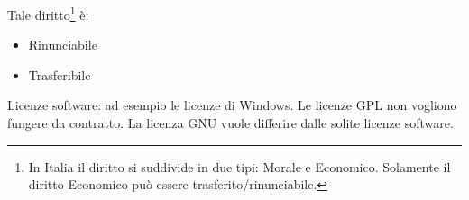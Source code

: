 Tale diritto\footnote{In Italia il diritto si suddivide in due tipi: Morale e Economico. Solamente il diritto Economico pu\`o essere trasferito/rinunciabile.} \`e:
\begin{itemize}

\item Rinunciabile
\item Trasferibile

\end{itemize}

Licenze software: ad esempio le licenze di Windows. Le licenze GPL non vogliono fungere da contratto. La licenza GNU vuole differire dalle solite licenze software.
